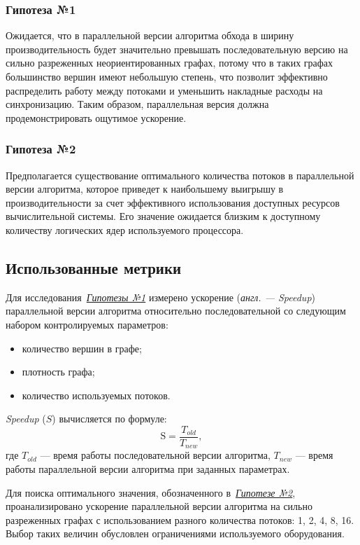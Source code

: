 \subsubsection*{Гипотеза №1}
\label{t1}
\noindent Ожидается, что в параллельной версии алгоритма обхода в ширину производительность будет значительно превышать последовательную версию на сильно разреженных неориентированных графах, потому что в таких графах большинство вершин имеют небольшую степень, что позволит эффективно распределить работу между потоками и уменьшить накладные расходы на синхронизацию. Таким образом, параллельная версия должна продемонстрировать ощутимое ускорение.

\subsubsection*{Гипотеза №2}
\label{t2}
\noindent Предполагается существование оптимального количества потоков в параллельной версии алгоритма, которое приведет к наибольшему выигрышу в производительности за счет эффективного использования доступных ресурсов вычислительной системы. Его значение ожидается близким к доступному количеству логических ядер используемого процессора.



\subsection{Использованные метрики}
\noindent Для исследования~\hyperref[t1]{\textit{Гипотезы №1}} измерено ускорение (\textit{англ. --- Speedup}) параллельной версии алгоритма относительно последовательной со следующим набором контролируемых параметров:
\begin{itemize}
    \item количество вершин в графе;
    \item плотность графа;
    \item количество используемых потоков.
\end{itemize}
\textit{Speedup} ($S$) вычисляется по формуле:
\begin{equation}
\label{eq:speedup}
	\text{S} = \frac{T_{old}}{T_{new}},
\end{equation}
где $T_{old}$ --- время работы последовательной версии алгоритма, $T_{new}$ --- время работы параллельной версии алгоритма при заданных параметрах.

Для поиска оптимального значения, обозначенного в~\hyperref[t2]{\textit{Гипотезе №2}}, проанализировано ускорение параллельной версии алгоритма на сильно разреженных графах с использованием разного количества потоков: 1, 2, 4, 8, 16. Выбор таких величин обусловлен ограничениями используемого оборудования.



